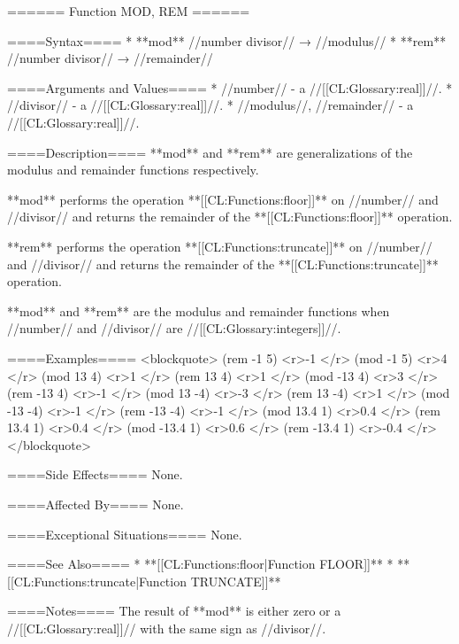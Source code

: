 ====== Function MOD, REM ======

====Syntax====
  * **mod** //number divisor// → //modulus// 
  * **rem** //number divisor// → //remainder//

====Arguments and Values====
  * //number// - a //[[CL:Glossary:real]]//.
  * //divisor// - a //[[CL:Glossary:real]]//.
  * //modulus//, //remainder// - a //[[CL:Glossary:real]]//.

====Description====
**mod** and **rem** are generalizations of the modulus and remainder functions respectively.

**mod** performs the operation **[[CL:Functions:floor]]** on //number// and //divisor// and returns the remainder of the **[[CL:Functions:floor]]** operation.

**rem** performs the operation **[[CL:Functions:truncate]]** on //number// and //divisor// and returns the remainder of the **[[CL:Functions:truncate]]** operation.

**mod** and **rem** are the modulus and remainder functions when //number// and //divisor// are //[[CL:Glossary:integers]]//.

====Examples==== 
<blockquote> 
(rem -1 5) <r>-1 </r>
(mod -1 5) <r>4 </r>
(mod 13 4) <r>1 </r>
(rem 13 4) <r>1 </r>
(mod -13 4) <r>3 </r>
(rem -13 4) <r>-1 </r>
(mod 13 -4) <r>-3 </r>
(rem 13 -4) <r>1 </r>
(mod -13 -4) <r>-1 </r>
(rem -13 -4) <r>-1 </r>
(mod 13.4 1) <r>0.4 </r>
(rem 13.4 1) <r>0.4 </r>
(mod -13.4 1) <r>0.6 </r>
(rem -13.4 1) <r>-0.4 </r>
</blockquote>

====Side Effects====
None.

====Affected By====
None.

====Exceptional Situations====
None.

====See Also====
  * **[[CL:Functions:floor|Function FLOOR]]**
  * **[[CL:Functions:truncate|Function TRUNCATE]]**

====Notes====
The result of **mod** is either zero or a //[[CL:Glossary:real]]// with the same sign as //divisor//.

